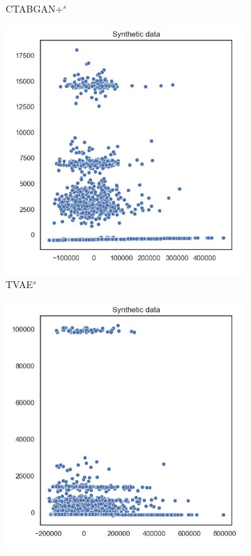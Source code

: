 \begin{figure}[h]
\begin{subfigure}{0.3\textwidth}
		\caption{CTABGAN+$^s$}
	\end{subfigure}
    \begin{subfigure}{0.3\textwidth}
        \includegraphics[width=\textwidth]{images/pca/tvae_simTune.jpg}
        \caption{TVAE$^s$}
    \end{subfigure}
	\begin{subfigure}{0.3\textwidth}
		\includegraphics[width=\textwidth]{images/pca/tab-ddpm-bgm-simTune.jpg}

\end{subfigure}
\end{figure}

